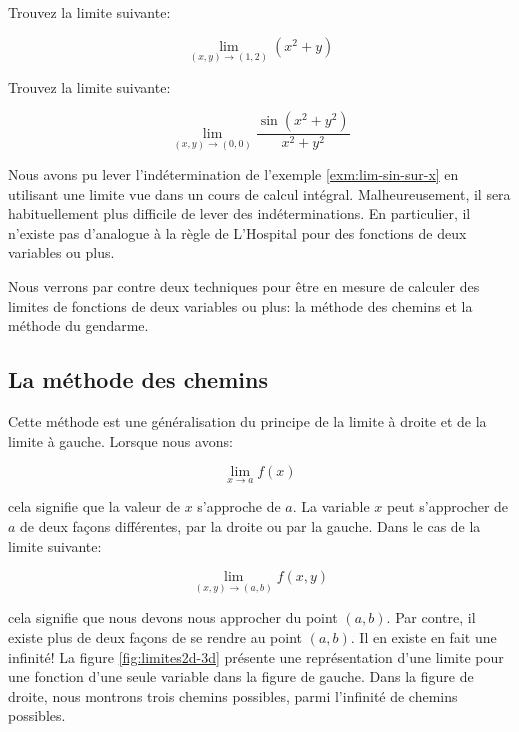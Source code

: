 \documentclass[]{book}
\theoremstyle{definition}
\theoremstyle{definition}
\theoremstyle{definition}
\theoremstyle{remark}
\let\BeginKnitrBlock\begin \let\EndKnitrBlock\end
\begin{document}
\BeginKnitrBlock{example}
\protect\hypertarget{exm:unnamed-chunk-136}{}{\label{exm:unnamed-chunk-136}
}Trouvez la limite suivante:

\[
\lim_{(x,y)\to(1,2)} (x^2+y)
\]
\EndKnitrBlock{example}

\BeginKnitrBlock{example}
\protect\hypertarget{exm:lim-sin-sur-x}{}{\label{exm:lim-sin-sur-x} }Trouvez
la limite suivante:

\[
\lim_{(x,y)\to(0,0)}\dfrac{\sin (x^2+y^2)}{x^2+y^2}
\]
\EndKnitrBlock{example}

Nous avons pu lever l'indétermination de l'exemple
\ref{exm:lim-sin-sur-x} en utilisant une limite vue dans un cours de
calcul intégral. Malheureusement, il sera habituellement plus difficile
de lever des indéterminations. En particulier, il n'existe pas
d'analogue à la règle de L'Hospital pour des fonctions de deux variables
ou plus.

Nous verrons par contre deux techniques pour être en mesure de calculer
des limites de fonctions de deux variables ou plus: la méthode des
chemins et la méthode du gendarme.

\hypertarget{la-methode-des-chemins}{%
\subsection{La méthode des chemins}\label{la-methode-des-chemins}}

Cette méthode est une généralisation du principe de la limite à droite
et de la limite à gauche. Lorsque nous avons:

\[ \lim_{x\to a} f(x) \]

cela signifie que la valeur de \(x\) s'approche de \(a\). La variable
\(x\) peut s'approcher de \(a\) de deux façons différentes, par la
droite ou par la gauche. Dans le cas de la limite suivante:

\[ \lim_{(x,y)\to (a,b)} f(x,y) \]

cela signifie que nous devons nous approcher du point \((a,b)\). Par
contre, il existe plus de deux façons de se rendre au point \((a,b)\).
Il en existe en fait une infinité! La figure \ref{fig:limites2d-3d}
présente une représentation d'une limite pour une fonction d'une seule
variable dans la figure de gauche. Dans la figure de droite, nous
montrons trois chemins possibles, parmi l'infinité de chemins possibles.
\end{document}
